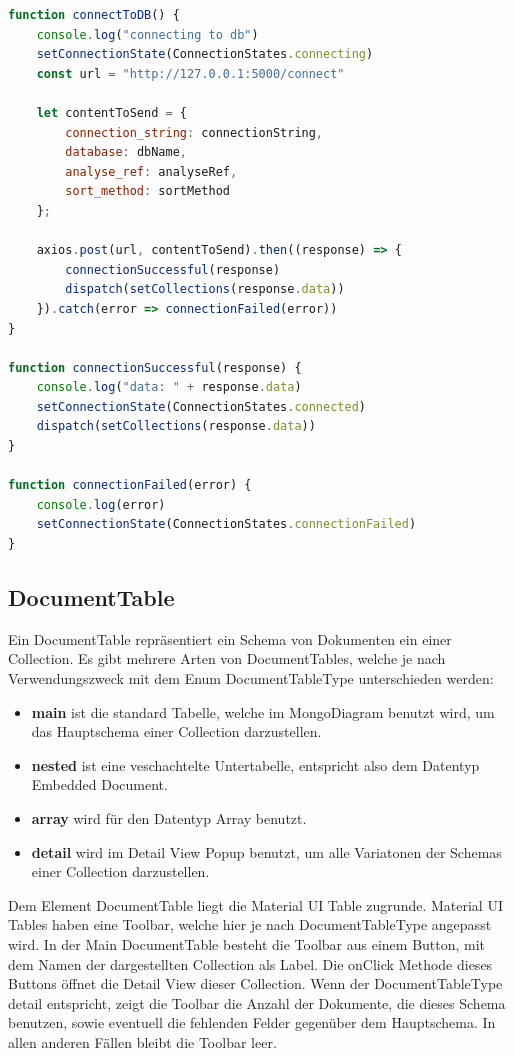 \begin{lstlisting}[language=JavaScript, caption={MongoLeftSideBar.connectToDB},label={lst:mongo_left_side_bar_connect_to_db}]
function connectToDB() {
    console.log("connecting to db")
    setConnectionState(ConnectionStates.connecting)
    const url = "http://127.0.0.1:5000/connect"

    let contentToSend = {
        connection_string: connectionString,
        database: dbName,
        analyse_ref: analyseRef,
        sort_method: sortMethod
    };

    axios.post(url, contentToSend).then((response) => {
        connectionSuccessful(response)
        dispatch(setCollections(response.data))
    }).catch(error => connectionFailed(error))
}

function connectionSuccessful(response) {
    console.log("data: " + response.data)
    setConnectionState(ConnectionStates.connected)
    dispatch(setCollections(response.data))
}

function connectionFailed(error) {
    console.log(error)
    setConnectionState(ConnectionStates.connectionFailed)
}
\end{lstlisting}

\subsection{DocumentTable}
\label{sub:fe_document_table}

Ein DocumentTable repräsentiert ein Schema von Dokumenten ein einer Collection.
Es gibt mehrere Arten von DocumentTables, welche je nach Verwendungszweck mit dem Enum DocumentTableType unterschieden werden:
\begin{itemize}
    \item \textbf{main} ist die standard Tabelle, welche im MongoDiagram benutzt wird, um das Hauptschema einer Collection darzustellen.
    \item \textbf{nested} ist eine veschachtelte Untertabelle, entspricht also dem Datentyp Embedded Document.
    \item \textbf{array} wird für den Datentyp Array benutzt.
    \item \textbf{detail} wird im Detail View Popup benutzt, um alle Variatonen der Schemas einer Collection darzustellen.
\end{itemize}

Dem Element DocumentTable liegt die Material UI Table zugrunde.
Material UI Tables haben eine Toolbar, welche hier je nach DocumentTableType angepasst wird.
In der Main DocumentTable besteht die Toolbar aus einem Button, mit dem Namen der dargestellten Collection als Label.
Die onClick Methode dieses Buttons öffnet die Detail View dieser Collection.
Wenn der DocumentTableType detail entspricht, zeigt die Toolbar die Anzahl der Dokumente, die dieses Schema benutzen, sowie eventuell die fehlenden Felder gegenüber dem Hauptschema.
In allen anderen Fällen bleibt die Toolbar leer.

